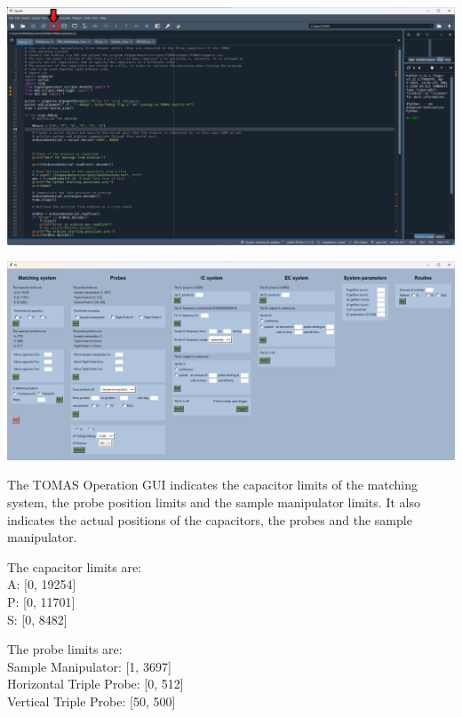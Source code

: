 \documentclass[fleqn,a4paper,20pt]{article}
\begin{document}
\begin{minipage}{\textwidth}
	\includegraphics[width=\linewidth]{Spyder2}
	\label{Spyder2}
	\vspace{0.6cm}
	
	\includegraphics[width=\linewidth]{GUI1}
	\label{GUI1}
\end{minipage}

\newpage
The TOMAS Operation GUI indicates the capacitor limits of the matching system, the probe position limits and the sample manipulator limits. It also indicates the actual positions of the capacitors, the probes and the sample manipulator.\\

\begin{minipage}{.5\textwidth}
The capacitor limits are:\\
A: [0, 19254]\\
P: [0, 11701]\\
S: [0, 8482]
\end{minipage}
\begin{minipage}{.5\textwidth}
The probe limits are:\\
Sample Manipulator: [1, 3697]\\
Horizontal Triple Probe: [0, 512]\\
Vertical Triple Probe: [50, 500]
\end{minipage}
\end{document}
